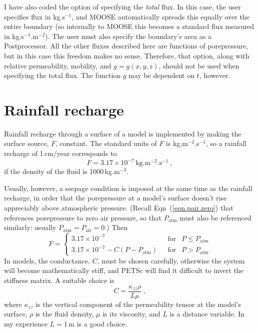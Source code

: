 \documentclass[]{scrreprt}
\begin{document}
I have also coded the option of specifying the {\em total} flux.  In
  this case, the user specifies flux in kg.s$^{-1}$, and MOOSE
  automatically spreads this equally over the entire boundary (so
  internally to MOOSE this becomes a standard flux measured in
  kg.s$^{-1}$.m$^{-2}$).  The user must also specify the boundary's
  area as a Postprocessor.  All the other fluxes described here are
  functions of porepressure, but in this case this freedom makes no
  sense.  Therefore, that option, along with relative permeability,
  mobility, and $g = g(x,y,z)$, should not be used when specifying the
  total flux.  The function $g$ may be dependent on $t$, however.





\section{Rainfall recharge}
\label{rainfall.recharge.sec}

Rainfall recharge through a surface of a model is implemented by
making the surface source, $F$, constant.  The standard
units of $F$ is kg.m$^{-2}$.s$^{-1}$, so a rainfall recharge of
1\,cm/year corresponds to
\begin{equation}
F = 3.17\times 10^{-7}\,\mbox{kg.m$^{-2}$.s$^{-1}$} \ ,
\end{equation}
if the density of the fluid is 1000\,kg.m$^{-3}$.

Usually, however, a seepage condition is imposed at the same time as
the rainfall recharge, in order that the porepressure at a model's
surface doesn't rise appreciably above atmospheric pressure.  (Recall
Eqn~(\ref{eqn.pair.zero}) that references porepressure to zero air
pressure, so that $P_{\mathrm{atm}}$ must also be referenced
similarly: usually $P_{\mathrm{atm}} = P_{\mathrm{air}} = 0$.) Then
\begin{equation}
F = \left\{
\begin{array}{ll}
3.17\times 10^{-7} & \ \ \ \mbox{for }\ \ P\leq P_{\mathrm{atm}} \\
3.17\times 10^{-7} - C(P-P_{\mathrm{atm}}) & \ \ \ \mbox{for }\ \ P >
P_{\mathrm{atm}}
\end{array}
\right.
\label{rain.rechage.eqn}
\end{equation}
In models, the conductance, $C$, must be chosen carefully, otherwise
the system will become mathematically stiff, and PETSc will find it
difficult to invert the stiffness matrix.  A suitable choice is
\begin{equation}
C = \frac{\kappa_{zz}\rho}{L\mu} \ ,
\label{cond.typical.eqn}
\end{equation}
where $\kappa_{zz}$ is the vertical component of the permeability
tensor at the model's surface, $\rho$ is the fluid density, $\mu$
is its viscosity, and $L$ is a distance variable.  In my experience
$L=1$\,m is a good choice.
\end{document}
